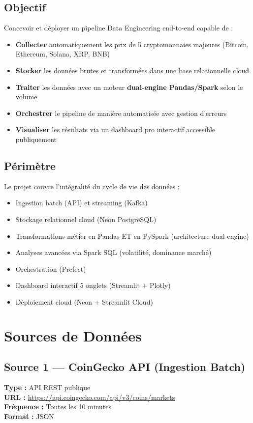 \documentclass[12pt,a4paper]{article}
\begin{document}
\subsection{Objectif}
Concevoir et déployer un pipeline Data Engineering end-to-end capable de :
\begin{itemize}
    \item \textbf{Collecter} automatiquement les prix de 5 cryptomonnaies majeures (Bitcoin, Ethereum, Solana, XRP, BNB)
    \item \textbf{Stocker} les données brutes et transformées dans une base relationnelle cloud
    \item \textbf{Traiter} les données avec un moteur \textbf{dual-engine Pandas/Spark} selon le volume
    \item \textbf{Orchestrer} le pipeline de manière automatisée avec gestion d'erreurs
    \item \textbf{Visualiser} les résultats via un dashboard pro interactif accessible publiquement
\end{itemize}

\subsection{Périmètre}
Le projet couvre l'intégralité du cycle de vie des données :
\begin{itemize}[noitemsep]
    \item Ingestion batch (API) et streaming (Kafka)
    \item Stockage relationnel cloud (Neon PostgreSQL)
    \item Transformations métier en Pandas ET en PySpark (architecture dual-engine)
    \item Analyses avancées via Spark SQL (volatilité, dominance marché)
    \item Orchestration (Prefect)
    \item Dashboard interactif 5 onglets (Streamlit + Plotly)
    \item Déploiement cloud (Neon + Streamlit Cloud)
\end{itemize}

\section{Sources de Données}

\subsection{Source 1 — CoinGecko API (Ingestion Batch)}
\textbf{Type :} API REST publique\\
\textbf{URL :} \url{https://api.coingecko.com/api/v3/coins/markets}\\
\textbf{Fréquence :} Toutes les 10 minutes\\
\textbf{Format :} JSON
\end{document}
